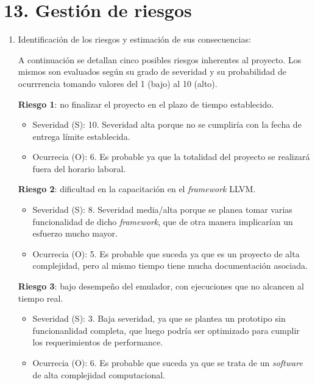 
\section{13. Gestión de riesgos}
\label{sec:riesgos}

\begin{enumerate}[label=\alph*)] %
\item Identificación de los riesgos y estimación de sus consecuencias:

  A continuación se detallan cinco posibles riesgos inherentes al proyecto. Los mismos son evaluados según su grado de severidad y su probabilidad de ocurrrencia tomando valores del 1 (bajo) al 10 (alto).

  \textbf{Riesgo 1}: no finalizar el proyecto en el plazo de tiempo establecido.

  \begin{itemize}
  \item Severidad (S): 10. Severidad alta porque no se cumpliría con la fecha de entrega límite establecida.
  \item Ocurrecia (O): 6. Es probable ya que la totalidad del proyecto se realizará fuera del horario laboral.
  \end{itemize}

  \textbf{Riesgo 2}: dificultad en la capacitación en el \textit{framework} LLVM.


  \begin{itemize}
  \item Severidad (S): 8. Severidad media/alta porque se planea tomar varias funcionalidad de dicho \textit{framework}, que de otra manera implicarían un esfuerzo mucho mayor.
  \item Ocurrecia (O): 5. Es probable que suceda ya que es un proyecto de alta complejidad, pero al mismo tiempo tiene mucha documentación asociada.
  \end{itemize}

  \textbf{Riesgo 3}: bajo desempeño del emulador, con ejecuciones que no alcancen al tiempo real.

  \begin{itemize}
  \item Severidad (S): 3. Baja severidad, ya que se plantea un prototipo sin funcionanlidad completa, que luego podría ser optimizado para cumplir los requerimientos de performance.
  \item Ocurrecia (O): 6. Es probable que suceda ya que se trata de un \textit{software} de alta complejidad computacional.
  \end{itemize}


\end{enumerate}
